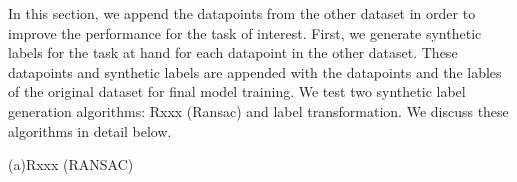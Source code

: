 \documentclass{article}
\begin{document}
In this section, we append the datapoints from the other dataset in order to improve the performance for the task of interest.
First, we generate synthetic labels for the task at hand for each datapoint in the other dataset.
These datapoints and synthetic labels are appended with the datapoints and the lables of the original dataset for final model training.
We test two synthetic label generation algorithms: Rxxx (Ransac) and label transformation.
We discuss these algorithms in detail below.

(a){Rxxx (RANSAC)}
\end{document}
